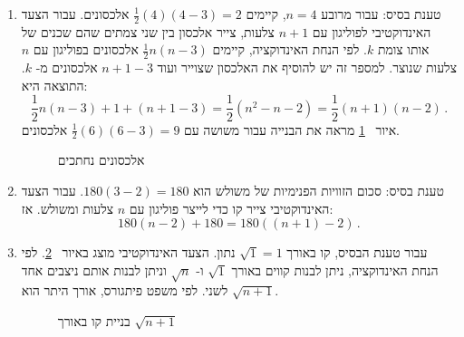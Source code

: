 \begin{enumerate}
\item
טענת בסיס: עבור מרובע 
$n=4$,
קיימים
$\frac{1}{2}(4)(4-3)=2$
אלכסונים. עבור הצעד האינדוקטיבי לפוליגון עם 
$n+1$
צלעות, צייר אלכסון בין שני צמתים שהם שכנים של אותו צומת 
$k$.
לפי הנחת האינדוקציה, קיימים
$\frac{1}{2}n(n-3)$
אלכסונים בפוליגון עם
$n$
צלעות שנוצר. למספר זה יש להוסיף את האלכסון שצוייר ועוד 
$n+1-3$
אלכסונים מ-%
$k$.
התוצאה היא:
\[
\frac{1}{2}n(n-3) + 1 + (n+1-3) =\frac{1}{2}(n^2-n-2)= \frac{1}{2}(n+1)(n-2)\,.
\] 
איור~%
\ref{fig.intersect}
מראה את הבנייה עבור משושה עם
$\frac{1}{2}(6)(6-3)=9$
אלכסונים.
\begin{figure}[t]
\begin{center}
\caption{%
אלכסונים נחתכים%
}\label{fig.intersect}
\end{center}
\end{figure}

\item 
טענת בסיס: סכום הזוויות הפנימיות של משולש הוא
$180(3-2)=180$.
עבור הצעד האינדוקטיבי צייר קו כדי לייצר פוליגון עם 
$n$
צלעות ומשולש. אז:
\[
180(n-2) + 180 = 180((n+1)-2)\,.
\]

\item
עבור טענת הבסיס, קו באורך 
$\sqrt{1}=1$
נתון. הצעד האינדוקטיבי מוצג באיור~%
\ref{fig.pyth}.
לפי הנחת האינדוקציה, ניתן לבנות קווים באורך 
$\sqrt{1}$
ו-%
$\sqrt{n}$
וניתן לבנות אותם ניצבים אחד לשני. לפי משפט פיתגורס, אורך היתר הוא
$\sqrt{n+1}$.

\begin{figure}[t]
\begin{center}
\caption{%
בניית קו באורך
$\sqrt{n+1}$}\label{fig.pyth}
\end{center}
\end{figure}


\end{enumerate}
